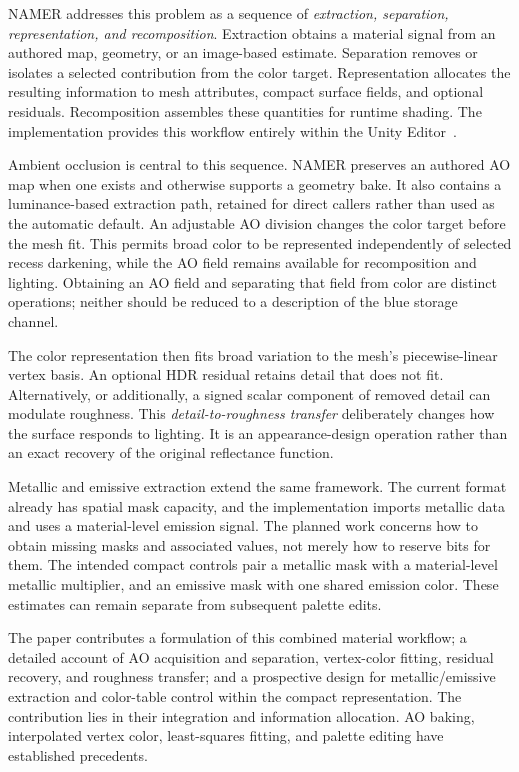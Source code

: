 \documentclass[11pt,letterpaper]{article}
\begin{document}
NAMER addresses this problem as a sequence of \emph{extraction, separation, representation, and recomposition}. Extraction obtains a material signal from an authored map, geometry, or an image-based estimate. Separation removes or isolates a selected contribution from the color target. Representation allocates the resulting information to mesh attributes, compact surface fields, and optional residuals. Recomposition assembles these quantities for runtime shading. The implementation provides this workflow entirely within the Unity Editor~\cite{namer2026}.

Ambient occlusion is central to this sequence. NAMER preserves an authored AO map when one exists and otherwise supports a geometry bake. It also contains a luminance-based extraction path, retained for direct callers rather than used as the automatic default. An adjustable AO division changes the color target before the mesh fit. This permits broad color to be represented independently of selected recess darkening, while the AO field remains available for recomposition and lighting. Obtaining an AO field and separating that field from color are distinct operations; neither should be reduced to a description of the blue storage channel.

The color representation then fits broad variation to the mesh's piecewise-linear vertex basis. An optional HDR residual retains detail that does not fit. Alternatively, or additionally, a signed scalar component of removed detail can modulate roughness. This \emph{detail-to-roughness transfer} deliberately changes how the surface responds to lighting. It is an appearance-design operation rather than an exact recovery of the original reflectance function.

Metallic and emissive extraction extend the same framework. The current format already has spatial mask capacity, and the implementation imports metallic data and uses a material-level emission signal. The planned work concerns how to obtain missing masks and associated values, not merely how to reserve bits for them. The intended compact controls pair a metallic mask with a material-level metallic multiplier, and an emissive mask with one shared emission color. These estimates can remain separate from subsequent palette edits.

The paper contributes a formulation of this combined material workflow; a detailed account of AO acquisition and separation, vertex-color fitting, residual recovery, and roughness transfer; and a prospective design for metallic/emissive extraction and color-table control within the compact representation. The contribution lies in their integration and information allocation. AO baking, interpolated vertex color, least-squares fitting, and palette editing have established precedents.
\end{document}
